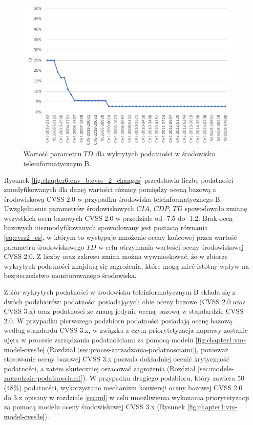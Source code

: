 \begin{figure}[!ht]
\centering
\includegraphics[width=.9\textwidth]{Chapters/Eksperymenty/env_B_results/cvss_2_td_env_b.pdf}
\caption{Wartość parametru $TD$ dla wykrytych podatności w środowisku teleinformatycznym B.}
\label{fig:chapter6:env_b:cvss_2_td}
\end{figure}

\bigbreak
Rysunek \ref{fig:chapter6:env_b:cvss_2_changes} przedstawia liczbę podatności zmodyfikowanych dla danej wartości różnicy pomiędzy oceną bazową a środowiskową CVSS 2.0 w przypadku środowiska teleinformatycznego B. Uwzględnienie parametrów środowiskowych $CIA$, $CDP$, $TD$ spowodowało zmianę wszystkich ocen bazowych CVSS 2.0 w przedziale od -7.5 do -1.2. Brak ocen bazowych niezmodyfikowanych spowodowany jest postacią równania \ref{eq:cvss2_es}, w którym to występuje mnożenie oceny końcowej przez wartość parametru środowiskowego $TD$ w celu otrzymania wartości oceny środowiskowej CVSS 2.0. Z liczby oraz zakresu zmian można wywnioskować, że w zbiorze wykrytych podatności znajdują się zagrożenia, które mogą mieć istotny wpływ na bezpieczeństwo monitorowanego środowiska. 

Zbiór wykrytych podatności w środowisku teleinformatycznym B składa się z dwóch podzbiorów: podatności posiadających obie oceny bazowe (CVSS 2.0 oraz CVSS 3.x) oraz podatności ze znaną jedynie oceną bazową w standardzie CVSS 2.0. W przypadku pierwszego podzbioru podatności posiadają ocenę bazową według standardu CVSS 3.x, w związku z czym priorytetyzacja naprawy zostanie ujęta w procesie zarządzania podatnościami za pomocą modelu \ref{fig:chapter1:vm-model-cvss3e} (Rozdział \ref{sec:proces-zarzadzania-podatnosciami}), ponieważ stosowanie oceny bazowej CVSS 3.x pozwala dokładniej ocenić krytyczność podatności, a zatem skuteczniej oszacować zagrożenia (Rozdział \ref{sec:modele-zarzadzaia-podatnosciami}). W przypadku drugiego podzbioru, który zawiera 50 (48\%) podatności, wykorzystano mechanizm konwersji oceny bazowej CVSS 2.0 do 3.x opisany w rozdziale \ref{sec:ml} w celu umożliwienia wykonania priorytetyzacji za pomocą modelu oceny środowiskowej CVSS 3.x (Rysunek \ref{fig:chapter1:vm-model-cvss3e}).

